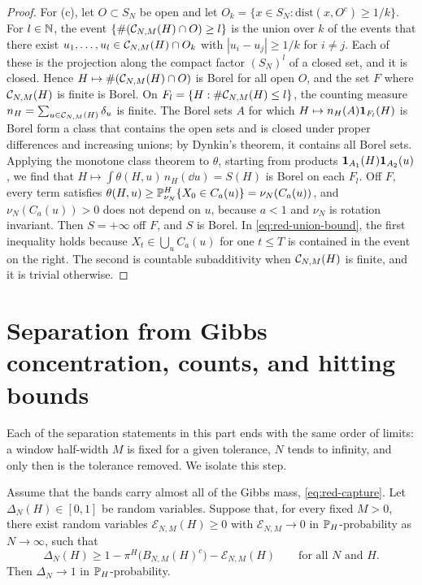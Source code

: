 \begin{proof}
For (c), let $O\subset S_N$ be open and let $O_k=\{x\in S_N:\mathrm{dist}(x,O^c)\ge1/k\}$. For $l\in\mathbb N$, the event $\{\#(\mathcal C_{N,M}(H)\cap O)\ge l\}$ is the union over $k$ of the events that there exist $u_1,\dots,u_l\in\mathcal C_{N,M}(H)\cap O_k$ with $|u_i-u_j|\ge1/k$ for $i\ne j$. Each of these is the projection along the compact factor $(S_N)^l$ of a closed set, and it is closed. Hence $H\mapsto\#(\mathcal C_{N,M}(H)\cap O)$ is Borel for all open $O$, and the set $F$ where $\mathcal C_{N,M}(H)$ is finite is Borel. On $F_l=\{H:\#\mathcal C_{N,M}(H)\le l\}$, the counting measure $n_H=\sum_{u\in\mathcal C_{N,M}(H)}\delta_u$ is finite. The Borel sets $A$ for which $H\mapsto n_H(A)\mathbf 1_{F_l}(H)$ is Borel form a class that contains the open sets and is closed under proper differences and increasing unions; by Dynkin's theorem, it contains all Borel sets. Applying the monotone class theorem to $\theta$, starting from products $\mathbf 1_{A_1}(H)\mathbf 1_{A_2}(u)$, we find that $H\mapsto\int\theta(H,u)\,n_H(\dd u)=S(H)$ is Borel on each $F_l$. Off $F$, every term satisfies $\theta(H,u)\ge\mathbb P^H_{\nu_N}\{X_0\in C_a(u)\}=\nu_N(C_a(u))$, and $\nu_N(C_a(u))>0$ does not depend on $u$, because $a<1$ and $\nu_N$ is rotation invariant. Then $S=+\infty$ off $F$, and $S$ is Borel. In \eqref{eq:red-union-bound}, the first inequality holds because $X_t\in\bigcup_uC_a(u)$ for one $t\le T$ is contained in the event on the right. The second is countable subadditivity when $\mathcal C_{N,M}(H)$ is finite, and it is trivial otherwise.
\end{proof}

\section{Separation from Gibbs concentration, counts, and hitting bounds}\label{sec:red-separation}

Each of the separation statements in this part ends with the same order of limits: a window half-width $M$ is fixed for a given tolerance, $N$ tends to infinity, and only then is the tolerance removed. We isolate this step.

\begin{lemma}\label{lem:red-test}
Assume that the bands carry almost all of the Gibbs mass, \eqref{eq:red-capture}. Let $\Delta_N(H)\in[0,1]$ be random variables. Suppose that, for every fixed $M>0$, there exist random variables $\mathcal E_{N,M}(H)\ge0$ with $\mathcal E_{N,M}\to0$ in $\mathbb P_H$-probability as $N\to\infty$, such that
\begin{equation*}
\Delta_N(H)\ge1-\pi^H\bigl(B_{N,M}(H)^c\bigr)-\mathcal E_{N,M}(H)\qquad\text{for all }N\text{ and }H.
\end{equation*}
Then $\Delta_N\to1$ in $\mathbb P_H$-probability.
\end{lemma}

